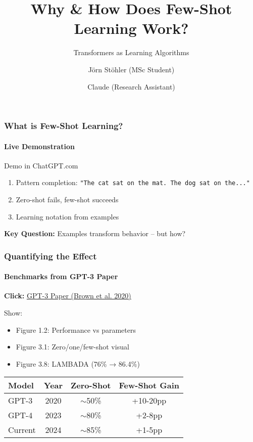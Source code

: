 \documentclass[10pt,aspectratio=169]{beamer}
\title{Why \& How Does Few-Shot Learning Work?}
\subtitle{Transformers as Learning Algorithms}
\author{Jörn Stöhler (MSc Student) \and Claude (Research Assistant)}
\institute{University of Augsburg}
\date{}
\begin{document}
\begin{frame}
\titlepage
\end{frame}


\begin{frame}
\frametitle{What is Few-Shot Learning?}
\framesubtitle{Live Demonstration}

\begin{center}
\Large
Demo in ChatGPT.com
\end{center}

\vspace{1cm}

\begin{enumerate}
    \item Pattern completion: \texttt{"The cat sat on the mat. The dog sat on the..."}
    \item Zero-shot fails, few-shot succeeds
    \item Learning notation from examples
\end{enumerate}

\vspace{1cm}
\textbf{Key Question:} Examples transform behavior -- but how?
\end{frame}


\begin{frame}
\frametitle{Quantifying the Effect}
\framesubtitle{Benchmarks from GPT-3 Paper}

\begin{center}
\Large
\textbf{Click:} \href{run:./papers/2005.14165_gpt3_language_models_few_shot.pdf}{\color{blue}GPT-3 Paper (Brown et al. 2020)}
\end{center}

\vspace{0.5cm}
Show:
\begin{itemize}
    \item Figure 1.2: Performance vs parameters
    \item Figure 3.1: Zero/one/few-shot visual
    \item Figure 3.8: LAMBADA (76\% → 86.4\%)
\end{itemize}

\vspace{0.5cm}
\begin{center}
\begin{tabular}{|l|c|c|c|}
\hline
Model & Year & Zero-Shot & Few-Shot Gain \\
\hline
GPT-3 & 2020 & $\sim$50\% & +10-20pp \\
GPT-4 & 2023 & $\sim$80\% & +2-8pp \\
Current & 2024 & $\sim$85\% & +1-5pp \\
\hline
\end{tabular}
\end{center}
\end{frame}
\end{document}
